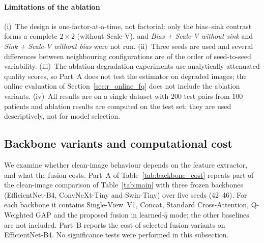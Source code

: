 \documentclass[final,5p,times,twocolumn,authoryear]{elsarticle}
\theoremstyle{plain}
\theoremstyle{remark}
\begin{document}
\paragraph{Limitations of the ablation} (i)~The design is one-factor-at-a-time, not factorial: only the bias--sink contrast forms a complete $2\times2$ (without Scale-V), and \emph{Bias + Scale-V without sink} and \emph{Sink + Scale-V without bias} were not run. (ii)~Three seeds are used and several differences between neighbouring configurations are of the order of seed-to-seed variability. (iii)~The ablation degradation experiments use analytically attenuated quality scores, so Part~A does not test the estimator on degraded images; the online evaluation of Section~\ref{sec:r_online_fq} does not include the ablation variants. (iv)~All results are on a single dataset with $200$ test pairs from $100$ patients and ablation results are computed on the test set; they are used descriptively, not for model selection.

\subsection{Backbone variants and computational cost}
\label{sec:r_backbone}

We examine whether clean-image behaviour depends on the feature extractor, and what the fusion costs. Part~A of Table~\ref{tab:backbone_cost} repeats part of the clean-image comparison of Table~\ref{tab:main} with three frozen backbones (EfficientNet-B4, ConvNeXt-Tiny and Swin-Tiny) over five seeds (42--46). For each backbone it contains Single-View~V1, Concat, Standard Cross-Attention, Q-Weighted GAP and the proposed fusion in learned-$\hat q$ mode; the other baselines are not included. Part~B reports the cost of selected fusion variants on EfficientNet-B4. No significance tests were performed in this subsection.
\end{document}
